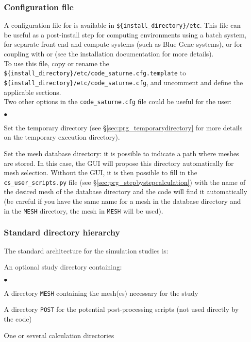 \subsubsection{Configuration file}
A configuration file for \CS is available in \texttt{\$\{install\_directory\}/etc}. This file can be useful as a post-install step
for computing environments using a batch system, for separate front-end and compute systems (such as Blue Gene systems),
or for coupling with  or \CA (see the installation documentation for more details).\\
To use this file, copy or rename the \texttt{\$\{install\_directory\}/etc/code\_saturne.cfg.template} to\\
\texttt{\$\{install\_directory\}/etc/code\_saturne.cfg}, and uncomment and define the applicable sections.\\
Two other options in the \texttt{code\_saturne.cfg} file could be useful for the user:
\begin{list}{$\bullet$}{}
\item Set the temporary directory (see \S\ref{sec:prg_temporarydirectory} for more details on the temporary execution directory).
\item Set the mesh database directory: it is possible to indicate a path where meshes are stored.
In this case, the GUI will propose this directory automatically for mesh selection. Without the GUI, it is
then possible to fill in the \texttt{cs\_user\_scripts.py} file (see \S\ref{sec:prg_stepbystepcalculation})
with the name of the desired mesh of the database directory and the code will
find it automatically (be careful if you have the same name for a mesh in the database directory
and in the \texttt{MESH} directory, the mesh in \texttt{MESH} will be used).
\end{list}

\subsubsection{Standard directory hierarchy}
\label{sec:prg_architecture}%
The standard architecture for the simulation studies is:

\noindent
An optional study directory containing:
\begin{list}{$\bullet$}{}
\item A directory \texttt{MESH} containing the mesh(es)
      necessary for the study
\item A directory \texttt{POST} for the potential post-processing scripts (not
used directly by the code)
\item One or several calculation directories
\end{list}

